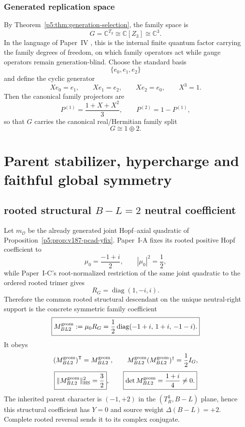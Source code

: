 \documentclass[12pt,a4paper]{article}
\begin{document}
\subsubsection{Generated replication space}
\label{p5:sec:part1-family-space}

By Theorem~\ref{p5:thm:generation-selection}, the family space is
\begin{equation}
\label{p5:eq:part1-G}
G=\mathbb C^{T_g}\cong \mathbb C[Z_3]\cong \mathbb C^3.
\end{equation}
In the language of Paper~IV \cite{Kugelmann2026e}, this is the internal finite quantum factor carrying the family degrees of freedom, on which family operators act while gauge operators remain generation-blind.
Choose the standard basis
\[
\{e_0,e_1,e_2\}
\]
and define the cyclic generator
\begin{equation}
\label{p5:eq:part1-X}
Xe_0=e_1,\qquad Xe_1=e_2,\qquad Xe_2=e_0,\qquad X^3=1.
\end{equation}
Then the canonical family projectors are
\begin{equation}
\label{p5:eq:part1-family-projectors}
P^{(1)}=\frac{1+X+X^2}{3},
\qquad
P^{(2)}=1-P^{(1)},
\end{equation}
so that \(G\) carries the canonical real/Hermitian family split
\[
G\cong 1\oplus 2.
\]


\section{Parent stabilizer, hypercharge and faithful global symmetry}
\label{p5a:sec:organized-charge}
\subsection{rooted structural \texorpdfstring{$B-L=2$}{B-L=2} neutral coefficient}
\label{p5:sec:v3103-structural-bl2-geometric-coefficient}

\begin{theorem}
\label{p5:thm:v3103-generated-bl2-family-coefficient}
Let $m_{\mathcal O}$ be the already generated joint Hopf--axial quadratic of
Proposition~\ref{p5:prop:v187-pcad-yfix}.  Paper~I-A fixes its rooted positive
Hopf coefficient to
\[
 \mu_0=\frac{-1+i}{2},
 \qquad |\mu_0|^2=\frac12,
\]
while Paper~I-C's root-normalized restriction of the same joint quadratic to
the ordered rooted trimer gives
\[
 R_G=\operatorname{diag}(1,-i,i).
\]
Therefore the common rooted structural descendant on the unique neutral-right
support is the concrete symmetric family coefficient
\[
 \boxed{
 M_{BL2}^{\rm geom}:=\mu_0R_G
 =\frac12\operatorname{diag}(-1+i,\,1+i,\,-1-i).}
\]
It obeys
\[
 (M_{BL2}^{\rm geom})^{\mathsf T}=M_{BL2}^{\rm geom},
 \qquad
 M_{BL2}^{\rm geom}(M_{BL2}^{\rm geom})^\dagger=\frac12I_G,
\]
\[
 \boxed{\|M_{BL2}^{\rm geom}\|_{\rm HS}^2=\frac32},
 \qquad
 \boxed{\det M_{BL2}^{\rm geom}=\frac{1+i}{4}\ne0.}
\]
The inherited parent character is $(-1,+2)$ in the
$(T_R^3,B-L)$ plane, hence this structural coefficient has $Y=0$ and source
weight $\Delta(B-L)=+2$.  Complete rooted reversal sends it to its complex
conjugate.
\end{theorem}
\end{document}
